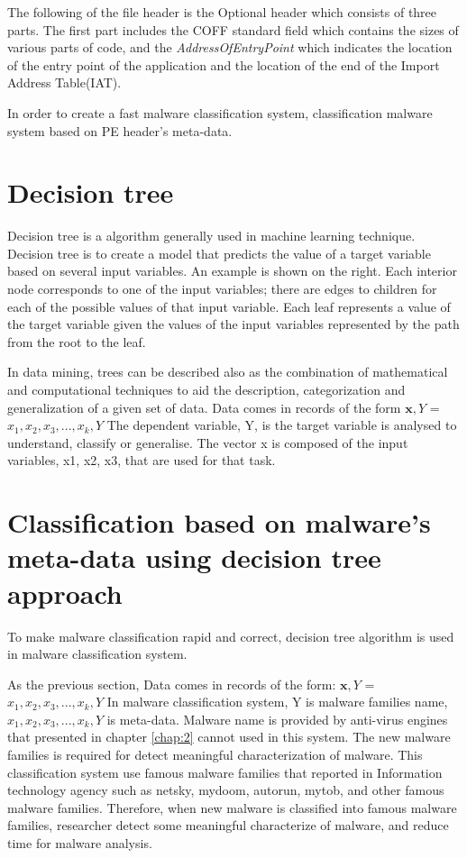 The following of the file header is the Optional header which consists of three parts. The first part includes the COFF standard field which contains the sizes of various parts of code, and the \emph{AddressOfEntryPoint} which indicates the location of the entry point of the application and the location of the end of the Import Address Table(IAT).

In order to create a fast malware classification system, classification malware system based on PE header's meta-data.

\section{Decision tree\cite{wikipedia}}
Decision tree is a algorithm generally used in machine learning technique. Decision tree is to create a model that predicts the value of a target variable based on several input variables. An example is shown on the right. Each interior node corresponds to one of the input variables; there are edges to children for each of the possible values of that input variable. Each leaf represents a value of the target variable given the values of the input variables represented by the path from the root to the leaf.

In data mining, trees can be described also as the combination of mathematical and computational techniques to aid the description, categorization and generalization of a given set of data.
Data comes in records of the form
\(\textbf{x},Y\) = \(x_1, x_2, x_3, ..., x_k, Y\)
The dependent variable, Y, is the target variable is analysed to understand, classify or generalise. The vector x is composed of the input variables, x1, x2, x3, that are used for that task.
\section{Classification based on malware's meta-data using decision tree approach}
To make malware classification rapid and correct, decision tree algorithm is used in malware classification system.

As the previous section, Data comes in records of the form:
\(\textbf{x},Y\) = \(x_1, x_2, x_3, ..., x_k, Y\)
In malware classification system, Y is malware families name, \(x_1, x_2, x_3, ..., x_k, Y\) is meta-data. Malware name is provided by anti-virus engines that presented in chapter \ref{chap:2} cannot used in this system. The new malware families is required for detect meaningful characterization of malware. This classification system use famous malware families that reported in Information technology agency such as netsky, mydoom, autorun, mytob, and other famous malware families. Therefore, when new malware is classified into famous malware families, researcher detect some meaningful characterize of malware, and reduce time for malware analysis. 

